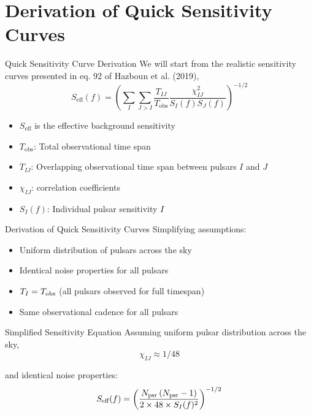 \documentclass{beamer}
\begin{document}
\section{Derivation of Quick Sensitivity Curves}

\begin{frame}{Quick Sensitivity Curve Derivation}
    We will start from the realistic sensitivity curves presented in eq. 92 of Hazboun et al. (2019),
    \[
    S_{\text{eff}}(f) = \left( \sum_I \sum_{J > I} \frac{T_{IJ}}{T_{\text{obs}}} \frac{\chi_{IJ}^2}{S_I(f) S_J(f)} \right)^{-1/2}
    \]
    \begin{itemize}
        \item $S_{\text{eff}}$ is the effective background sensitivity
        \item $T_{\text{obs}}$: Total observational time span
        \item $T_{IJ}$: Overlapping observational time span between pulsars $I$ and $J$
        \item $\chi_{IJ}$: correlation coefficients
        \item $S_I(f)$: Individual pulsar sensitivity $I$
    \end{itemize}
\end{frame}

\begin{frame}{Derivation of Quick Sensitivity Curves}
    Simplifying assumptions:
    \begin{itemize}
        \item Uniform distribution of pulsars across the sky
        \item Identical noise properties for all pulsars
        \item $T_I = T_{\rm obs}$ (all pulsars observed for full timespan)
        \item Same observational cadence for all pulsars
    \end{itemize}
\end{frame}

\begin{frame}{Simplified Sensitivity Equation}
    Assuming uniform pulsar distribution across the sky,
    \[
    \chi_{IJ} \approx 1/48
    \]

    and identical noise properties:
    \[
    S_{\text{eff}}(f) = \left(\frac{N_{\rm psr}\left(N_{\rm psr}-1\right)}{2 \times 48 \times S_I(f)^2} \right)^{-1/2}
    \]
\end{frame}
\end{document}
